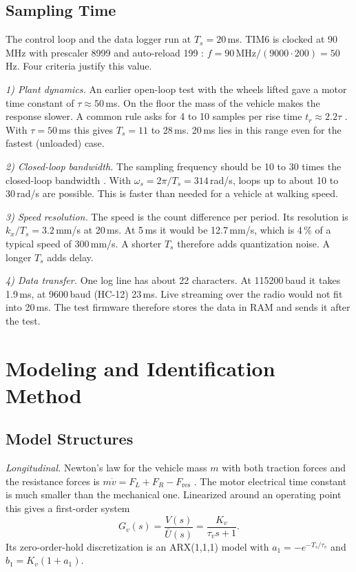 \documentclass[conference]{IEEEtran}
\begin{document}
\subsection{Sampling Time}\label{sec:ts}
The control loop and the data logger run at $T_s = 20$\,ms. TIM6 is clocked
at 90\,MHz with prescaler 8999 and auto-reload 199 \cite{rm0390}:
$f = 90\,\mathrm{MHz}/(9000\cdot 200) = 50$\,Hz. Four criteria justify this
value.

\emph{1) Plant dynamics.} An earlier open-loop test with the wheels lifted
gave a motor time constant of $\tau \approx 50$\,ms. On the floor the mass
of the vehicle makes the response slower. A common rule asks for 4 to 10
samples per rise time $t_r \approx 2.2\tau$ \cite{astrom}. With
$\tau = 50$\,ms this gives $T_s = 11$ to 28\,ms. 20\,ms lies in this range
even for the fastest (unloaded) case.

\emph{2) Closed-loop bandwidth.} The sampling frequency should be 10 to 30
times the closed-loop bandwidth \cite{astrom}. With
$\omega_s = 2\pi/T_s = 314$\,rad/s, loops up to about 10 to 30\,rad/s are
possible. This is faster than needed for a vehicle at walking speed.

\emph{3) Speed resolution.} The speed is the count difference per period.
Its resolution is $k_x/T_s = 3.2$\,mm/s at 20\,ms. At 5\,ms it would be
12.7\,mm/s, which is 4\,\% of a typical speed of 300\,mm/s. A shorter
$T_s$ therefore adds quantization noise. A longer $T_s$ adds delay.

\emph{4) Data transfer.} One log line has about 22 characters. At
115200\,baud it takes 1.9\,ms, at 9600\,baud (HC-12) 23\,ms. Live
streaming over the radio would not fit into 20\,ms. The test firmware
therefore stores the data in RAM and sends it after the test.

\section{Modeling and Identification Method}
\subsection{Model Structures}
\emph{Longitudinal.} Newton's law for the vehicle mass $m$ with both
traction forces and the resistance forces is
$m\dot v = F_L + F_R - F_{\mathrm{res}}$ \cite{rajamani}. The motor
electrical time constant is much smaller than the mechanical one.
Linearized around an operating point this gives a first-order system
\begin{equation}
G_v(s) = \frac{V(s)}{\bar U(s)} = \frac{K_v}{\tau_v s + 1}.
\label{eq:lon}
\end{equation}
Its zero-order-hold discretization is an ARX(1,1,1) model with
$a_1 = -e^{-T_s/\tau_v}$ and $b_1 = K_v(1+a_1)$.
\end{document}
